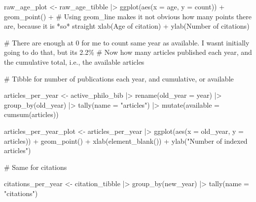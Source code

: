 \documentclass[
  10pt,
  letterpaper,
  DIV=11,
  numbers=noendperiod,
  twoside]{scrartcl}
\newenvironment{Shaded}{\begin{snugshade}}{\end{snugshade}}
\newcommand{\AttributeTok}[1]{\textcolor[rgb]{0.40,0.45,0.13}{#1}}
\newcommand{\CommentTok}[1]{\textcolor[rgb]{0.37,0.37,0.37}{#1}}
\newcommand{\FunctionTok}[1]{\textcolor[rgb]{0.28,0.35,0.67}{#1}}
\newcommand{\NormalTok}[1]{\textcolor[rgb]{0.00,0.23,0.31}{#1}}
\newcommand{\OtherTok}[1]{\textcolor[rgb]{0.00,0.23,0.31}{#1}}
\newcommand{\SpecialCharTok}[1]{\textcolor[rgb]{0.37,0.37,0.37}{#1}}
\newcommand{\StringTok}[1]{\textcolor[rgb]{0.13,0.47,0.30}{#1}}
\begin{document}
\begin{Shaded}
\begin{Highlighting}[]
\NormalTok{raw\_age\_plot }\OtherTok{\textless{}{-}}\NormalTok{ raw\_age\_tibble }\SpecialCharTok{|\textgreater{}}
  \FunctionTok{ggplot}\NormalTok{(}\FunctionTok{aes}\NormalTok{(}\AttributeTok{x =}\NormalTok{ age, }\AttributeTok{y =}\NormalTok{ count)) }\SpecialCharTok{+}
  \FunctionTok{geom\_point}\NormalTok{() }\SpecialCharTok{+} \CommentTok{\# Using geom\_line makes it not obvious how many points there are, because it is *so* straight}
  \FunctionTok{xlab}\NormalTok{(}\StringTok{\textquotesingle{}Age of citation\textquotesingle{}}\NormalTok{) }\SpecialCharTok{+}
  \FunctionTok{ylab}\NormalTok{(}\StringTok{\textquotesingle{}Number of citations\textquotesingle{}}\NormalTok{)}

\CommentTok{\# There are enough at 0 for me to count same year as \textquotesingle{}available\textquotesingle{}. I wasn\textquotesingle{}t initially going to do that, but it\textquotesingle{}s 2.2\%}
\CommentTok{\# Now how many articles published each year, and the cumulative total, i.e., the \textquotesingle{}available\textquotesingle{} articles}

\CommentTok{\# Tibble for number of publications each year, and cumulative, or \textquotesingle{}available\textquotesingle{}}

\NormalTok{articles\_per\_year }\OtherTok{\textless{}{-}}\NormalTok{ active\_philo\_bib }\SpecialCharTok{|\textgreater{}}
  \FunctionTok{rename}\NormalTok{(}\AttributeTok{old\_year =}\NormalTok{ year) }\SpecialCharTok{|\textgreater{}}
  \FunctionTok{group\_by}\NormalTok{(old\_year) }\SpecialCharTok{|\textgreater{}}
  \FunctionTok{tally}\NormalTok{(}\AttributeTok{name =} \StringTok{"articles"}\NormalTok{) }\SpecialCharTok{|\textgreater{}}
  \FunctionTok{mutate}\NormalTok{(}\AttributeTok{available =} \FunctionTok{cumsum}\NormalTok{(articles))}

\NormalTok{articles\_per\_year\_plot }\OtherTok{\textless{}{-}}\NormalTok{ articles\_per\_year }\SpecialCharTok{|\textgreater{}}
  \FunctionTok{ggplot}\NormalTok{(}\FunctionTok{aes}\NormalTok{(}\AttributeTok{x =}\NormalTok{ old\_year, }\AttributeTok{y =}\NormalTok{ articles)) }\SpecialCharTok{+}
  \FunctionTok{geom\_point}\NormalTok{() }\SpecialCharTok{+}
  \FunctionTok{xlab}\NormalTok{(}\FunctionTok{element\_blank}\NormalTok{()) }\SpecialCharTok{+}
  \FunctionTok{ylab}\NormalTok{(}\StringTok{"Number of indexed articles"}\NormalTok{)}

\CommentTok{\# Same for citations}

\NormalTok{citations\_per\_year }\OtherTok{\textless{}{-}}\NormalTok{ citation\_tibble }\SpecialCharTok{|\textgreater{}}
  \FunctionTok{group\_by}\NormalTok{(new\_year) }\SpecialCharTok{|\textgreater{}}
  \FunctionTok{tally}\NormalTok{(}\AttributeTok{name =} \StringTok{"citations"}\NormalTok{) }


\end{Highlighting}
\end{Shaded}
\end{document}
